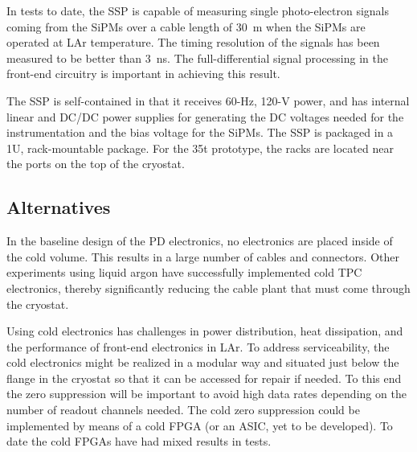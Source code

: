 In tests to date, the SSP is capable of measuring single
photo-electron signals coming from the SiPMs over a cable length of 30~m when the SiPMs are operated at LAr temperature.  The timing
resolution of the signals has been measured to be better than 3~ns.
The full-differential signal processing in the front-end circuitry is
important in achieving this result.
 
The SSP is self-contained in that it receives 60-Hz, 120-V power, and
has internal linear and DC/DC power supplies for generating the DC
voltages needed for the instrumentation %
and the bias voltage
for the SiPMs.  The SSP is packaged in a 1U, rack-mountable
package. For the 35t prototype, the racks are located near the
ports on the top of the cryostat.

\subsection{Alternatives}
\label{sec_alt}



In the baseline \fixme{} design of the PD electronics, %
no electronics are placed inside of the cold volume.  This results in a
large number of cables and connectors.  Other experiments using liquid
argon have successfully implemented cold TPC electronics, thereby
significantly reducing the cable plant that must come through the
cryostat.  

Using cold electronics  has challenges in power distribution, heat
dissipation, and the performance of front-end electronics in LAr. To
address serviceability, the cold electronics might be realized in a
modular way and situated just below the flange in the cryostat so that
it can be accessed for repair if needed.  To this end
the zero suppression will be important to avoid high data rates
depending on the number of readout channels needed.  %
The cold zero suppression %
could be implemented by means of a cold FPGA (or an
ASIC, yet to be developed).  To date the cold FPGAs have had mixed
results in tests. 


